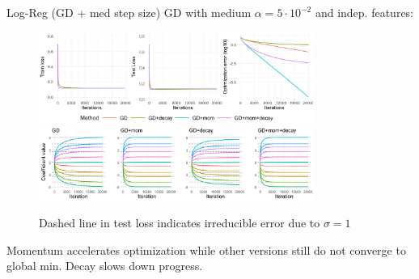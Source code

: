 \documentclass[11pt,compress,t,notes=noshow, xcolor=table]{beamer}
\begin{document}
\begin{vbframe}{Log-Reg (GD + med step size)}
\vspace{-0.4cm}
GD with medium $\alpha=5\cdot10^{-2}$ and indep. features:
\begin{figure}
            \includegraphics[width=0.8\textwidth]{slides/04-multivariate-first-order/figure_man/simu_linmod/GD_log_med_lr_iters.pdf} \\
             \includegraphics[width=0.8\textwidth]{slides/04-multivariate-first-order/figure_man/simu_linmod/GD_log_coef_med.pdf}\\
            \begin{footnotesize}
                Dashed line in test loss indicates irreducible error due to $\sigma=1$
            \end{footnotesize}
\end{figure}
Momentum accelerates optimization while other versions still do not converge to global min. Decay slows down progress.
\end{vbframe}
\end{document}

